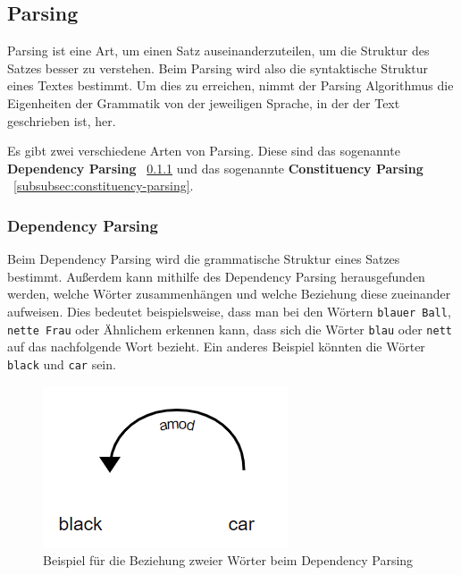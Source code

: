 \subsection{Parsing}\label{subsec:parsing}

Parsing ist eine Art, um einen Satz auseinanderzuteilen, um die Struktur des Satzes besser zu verstehen.
Beim Parsing wird also die syntaktische Struktur eines Textes bestimmt.
Um dies zu erreichen, nimmt der Parsing Algorithmus die Eigenheiten der Grammatik von der jeweiligen Sprache, in der der Text geschrieben ist, her.\cite{textAnalysisMonkeylearn}

Es gibt zwei verschiedene Arten von Parsing.
Diese sind das sogenannte \textbf{Dependency Parsing} ~\ref{subsubsec:dependency-parsing} und das sogenannte \textbf{Constituency Parsing} ~\ref{subsubsec:constituency-parsing}.

\subsubsection{Dependency Parsing}\label{subsubsec:dependency-parsing}

Beim Dependency Parsing wird die grammatische Struktur eines Satzes bestimmt.
Außerdem kann mithilfe des Dependency Parsing herausgefunden werden, welche Wörter zusammenhängen und welche Beziehung diese zueinander aufweisen.
Dies bedeutet beispielsweise, dass man bei den Wörtern \texttt{blauer Ball}, \texttt{nette Frau} oder Ähnlichem erkennen kann, dass sich die Wörter \texttt{blau} oder \texttt{nett} auf das nachfolgende Wort bezieht.
Ein anderes Beispiel könnten die Wörter \texttt{black} und \texttt{car} sein.

\begin{figure}[hbt!]
    \centering
    \includegraphics[scale=1]{pics/dependency_parsing}
    \caption{Beispiel für die Beziehung zweier Wörter beim Dependency Parsing~\cite{dependencyParsing}}
    \label{fig:dependency_parsing_relation}
\end{figure}

